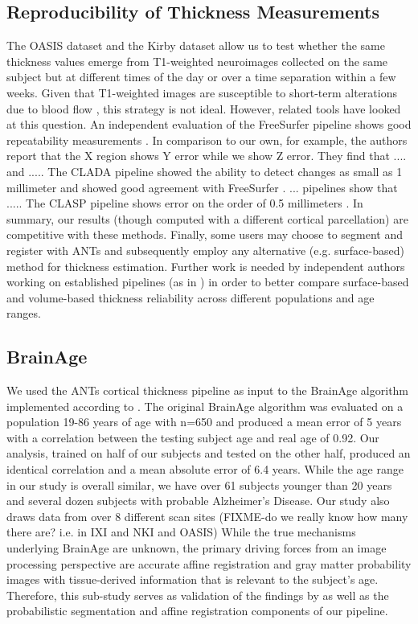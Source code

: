 \subsection{Reproducibility of Thickness Measurements}
The OASIS dataset and the Kirby dataset allow us to test whether the same
thickness values emerge from T1-weighted
neuroimages collected on the same subject but at different times of
the day or over a time separation within a few weeks.  Given that
T1-weighted images are susceptible to short-term alterations due to
blood flow \cite{DetrePaper,2006paper}, this strategy is not ideal.  However, related
tools have looked at this question. An independent evaluation of the FreeSurfer pipeline shows good
repeatability measurements \cite{jovicich2013}.  In comparison to our
own, for example, the authors report that the X region shows Y error
while we show Z error.  They find
that .... and .....  The CLADA pipeline showed the ability to detect
changes as small as 1 millimeter and showed good agreement with
FreeSurfer \cite{nakamura2011}. ... pipelines show that ..... The
CLASP pipeline shows error on the order of 0.5 millimeters \cite{kim2005}.   In summary, our results (though computed
with a different cortical parcellation) are competitive with these
methods.  Finally, some users may choose to segment and register
with ANTs and subsequently employ any alternative (e.g. surface-based)
method for thickness estimation.  Further work is needed by
independent authors working on established pipelines (as in \cite{jovicich2013}) in order to
better compare surface-based and volume-based thickness reliability
across different populations and age ranges. 

\subsection{BrainAge} 
We used the ANTs cortical thickness pipeline as input to the BrainAge
algorithm implemented according to \cite{franke2010}.  The original
BrainAge algorithm was evaluated on a population 19-86 years of age
with n=650 and produced a mean error of 5 years with a correlation
between the testing subject age and real age of 0.92.  Our analysis,
trained on half of our subjects and tested on the other half, produced
an identical correlation and a mean absolute error of 6.4 years.
While the age range in our study is overall similar, we have over
61 subjects younger than 20 years and several dozen subjects with
probable Alzheimer's Disease.  Our study also draws data from over
8 different scan sites (FIXME-do we really know how many there
are? i.e. in IXI and NKI and OASIS)  While the true mechanisms underlying BrainAge are unknown, the
primary driving forces from an image processing perspective are accurate affine registration and gray
matter probability images with tissue-derived information that is
relevant to the subject's age.  Therefore, this sub-study serves as
validation of the findings by \cite{franke2010} as well as the
probabilistic segmentation and affine registration components of our
pipeline.

